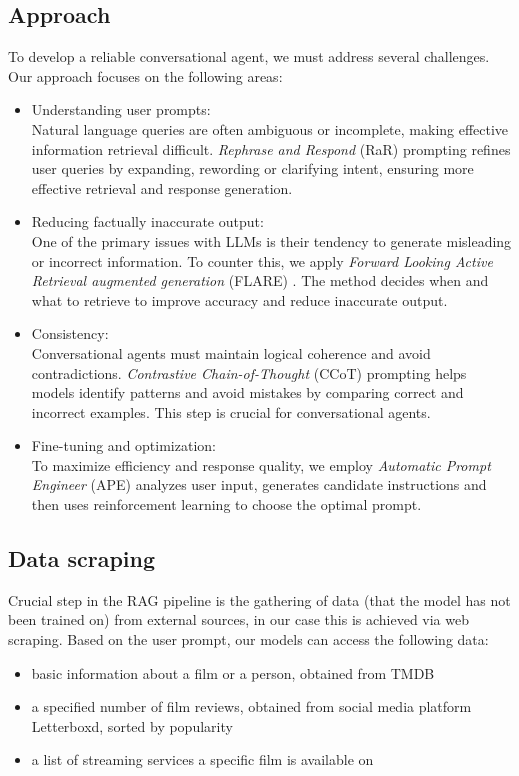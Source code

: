 \documentclass[fleqn,moreauthors,10pt]{ds_report}
\begin{document}
\subsection*{Approach}
To develop a reliable conversational agent, we must address several challenges.
Our approach focuses on the following areas:
\begin{itemize}
\item Understanding user prompts:\\
Natural language queries are often ambiguous or incomplete, making effective information retrieval difficult.
\textit{Rephrase and Respond} (RaR) \cite{RaR} prompting refines user queries by expanding, rewording or clarifying intent, ensuring more effective retrieval and response generation.
\item Reducing factually inaccurate output:\\
One of the primary issues with LLMs is their tendency to generate misleading or incorrect information. 
To counter this, we apply \textit{Forward Looking Active Retrieval augmented generation} (FLARE) \cite{FLARE}. The method decides when and what to retrieve to improve accuracy and reduce inaccurate output.
\item Consistency:\\
Conversational agents must maintain logical coherence and avoid contradictions.
\textit{Contrastive Chain-of-Thought} (CCoT) \cite{CCoT} prompting helps models identify patterns and avoid mistakes by comparing correct and incorrect examples.
This step is crucial for conversational agents.
\item Fine-tuning and optimization:\\
To maximize efficiency and response quality, we employ
\textit{Automatic Prompt Engineer} (APE) \cite{APE} analyzes user input, generates candidate instructions and then uses reinforcement learning to choose the optimal prompt. 
\end{itemize}


\subsection*{Data scraping}

Crucial step in the RAG pipeline is the gathering of data (that the model has not been trained on) from external sources, in our case this is achieved via web scraping. Based on the user prompt, our models can access the following data:
\begin{itemize}
	\item basic information about a film or a person, obtained from TMDB
	\item a specified number of film reviews, obtained from social media platform Letterboxd, sorted by popularity
	\item a list of streaming services a specific film is available on
\end{itemize}
\end{document}
